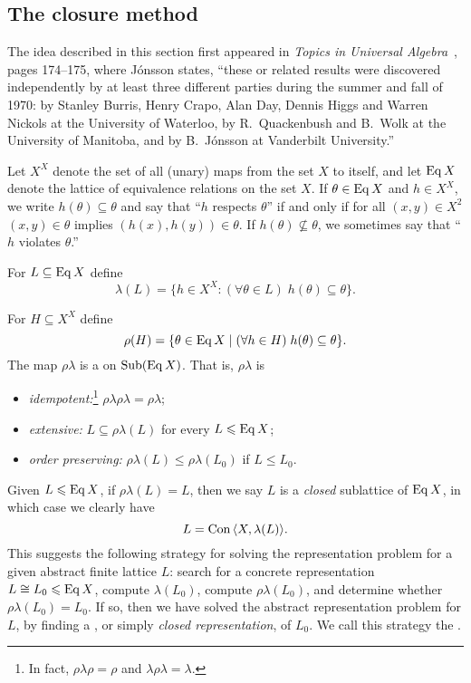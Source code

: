 \subsection{The closure method}
\label{sec:closure-method}
The idea described in this section
first appeared in \emph{Topics in Universal Algebra}~\cite{Jonsson:1972}, pages
174--175, where J\'onsson states, ``these or related results were discovered
independently by at least three different parties during the summer and fall of
1970: by Stanley Burris, Henry Crapo, Alan Day, Dennis Higgs and Warren Nickols
at the University of Waterloo, by R.~Quackenbush and B.~Wolk at the University
of Manitoba, and by B.~J\'{o}nsson at Vanderbilt University.''

Let $X^X$ denote the set of all (unary) maps from the set $X$ to itself, and let 
$\operatorname{Eq} X$ denote the lattice of equivalence relations on the set $X$.  If $\theta
\in \operatorname{Eq} X$ and $h\in X^X$, we write $h(\theta) \subseteq \theta$ and say
that ``$h$ respects $\theta$'' if and only if for all $(x,y)\in X^2$ $(x,y)\in
\theta$ implies 
$(h(x),h(y)) \in \theta$.  If $h(\theta) \nsubseteq \theta$, we sometimes say
that ``$h$ violates $\theta$.''

For $L\subseteq \operatorname{Eq} X$ define
\[
\lambda(L) = \{h\in X^X: (\forall \theta \in L) \; h(\theta) \subseteq \theta \}.
\]

For $H\subseteq X^X$ define
\[
\rho(H) = \{\theta \in \operatorname{Eq} X \mid   (\forall h\in H) \; h(\theta) \subseteq \theta\}.
\]
The map $\rho \lambda$ is a  on $\operatorname{Sub}(\operatorname{Eq} X)$.
That is, $\rho \lambda$ is
\begin{itemize}
\item \emph{idempotent:}\footnote{In fact, $\rho \lambda \rho = \rho$ and 
  $\lambda \rho \lambda = \lambda$.} $\rho \lambda \rho \lambda = \rho \lambda$;
\item \emph{extensive:} $L \subseteq \rho \lambda (L)$ for every $L \leqslant \operatorname{Eq} X$;
\item \emph{order preserving:} $\rho \lambda (L) \leq \rho \lambda (L_0)$ if $L \leq L_0$.
\end{itemize}
Given $L\leqslant \operatorname{Eq} X$, if $\rho\lambda(L) = L$, then we say $L$ is a 
\emph{closed} sublattice of $\operatorname{Eq} X$, in which case we clearly have
\[L = \operatorname{Con\,} \langle X, \lambda(L)\rangle.\]
This suggests the following strategy for solving the representation problem for a
given abstract finite lattice $L$: search for a concrete representation $L \cong
L_0\leqslant \operatorname{Eq} X$,
compute $\lambda(L_0)$, compute $\rho\lambda(L_0)$, and determine whether 
$\rho\lambda(L_0) = L_0$.  If so, then we have solved the abstract representation
problem for $L$, by finding a , or simply
\emph{closed representation}, of $L_0$.  We call this strategy the .

